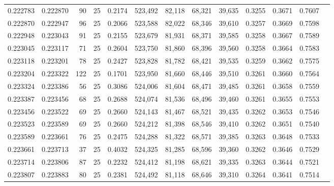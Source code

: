 \begin{tabular}{rrrrrrrrrrrrr}
0.222783 & 0.222870 &    90 &  25 &                                     0.2174 & 523,492 &  82,118 &  68,321 &  39,635 & 0.3255 & 0.3671 & 0.7607 \\
0.222870 & 0.222947 &    96 &  25 &                                     0.2066 & 523,588 &  82,022 &  68,346 &  39,610 & 0.3257 & 0.3669 & 0.7598 \\
0.222948 & 0.223043 &    91 &  25 &                                     0.2155 & 523,679 &  81,931 &  68,371 &  39,585 & 0.3258 & 0.3667 & 0.7589 \\
0.223045 & 0.223117 &    71 &  25 &                                     0.2604 & 523,750 &  81,860 &  68,396 &  39,560 & 0.3258 & 0.3664 & 0.7583 \\
0.223118 & 0.223201 &    78 &  25 &                                     0.2427 & 523,828 &  81,782 &  68,421 &  39,535 & 0.3259 & 0.3662 & 0.7575 \\
0.223204 & 0.223322 &   122 &  25 &                                     0.1701 & 523,950 &  81,660 &  68,446 &  39,510 & 0.3261 & 0.3660 & 0.7564 \\
0.223324 & 0.223386 &    56 &  25 &                                     0.3086 & 524,006 &  81,604 &  68,471 &  39,485 & 0.3261 & 0.3658 & 0.7559 \\
0.223387 & 0.223456 &    68 &  25 &                                     0.2688 & 524,074 &  81,536 &  68,496 &  39,460 & 0.3261 & 0.3655 & 0.7553 \\
0.223456 & 0.223522 &    69 &  25 &                                     0.2660 & 524,143 &  81,467 &  68,521 &  39,435 & 0.3262 & 0.3653 & 0.7546 \\
0.223523 & 0.223589 &    69 &  25 &                                     0.2660 & 524,212 &  81,398 &  68,546 &  39,410 & 0.3262 & 0.3651 & 0.7540 \\
0.223589 & 0.223661 &    76 &  25 &                                     0.2475 & 524,288 &  81,322 &  68,571 &  39,385 & 0.3263 & 0.3648 & 0.7533 \\
0.223661 & 0.223713 &    37 &  25 &                                     0.4032 & 524,325 &  81,285 &  68,596 &  39,360 & 0.3262 & 0.3646 & 0.7529 \\
0.223714 & 0.223806 &    87 &  25 &                                     0.2232 & 524,412 &  81,198 &  68,621 &  39,335 & 0.3263 & 0.3644 & 0.7521 \\
0.223807 & 0.223883 &    80 &  25 &                                     0.2381 & 524,492 &  81,118 &  68,646 &  39,310 & 0.3264 & 0.3641 & 0.7514 \\

\end{tabular}
